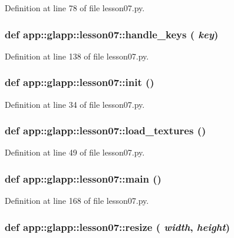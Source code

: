 Definition at line 78 of file lesson07.py.
\subsubsection{\setlength{\rightskip}{0pt plus 5cm}def app::glapp::lesson07::handle\_\-keys ( {\em key})}\label{namespaceapp_1_1glapp_1_1lesson07_1be348b6675ca03d80a6f1445422357c}




Definition at line 138 of file lesson07.py.
\subsubsection{\setlength{\rightskip}{0pt plus 5cm}def app::glapp::lesson07::init ()}\label{namespaceapp_1_1glapp_1_1lesson07_ccef139a68b9f82e4ade7b66ee1bfe27}




Definition at line 34 of file lesson07.py.
\subsubsection{\setlength{\rightskip}{0pt plus 5cm}def app::glapp::lesson07::load\_\-textures ()}\label{namespaceapp_1_1glapp_1_1lesson07_9e70d32929bccdedf5daa574f74a4504}




Definition at line 49 of file lesson07.py.
\subsubsection{\setlength{\rightskip}{0pt plus 5cm}def app::glapp::lesson07::main ()}\label{namespaceapp_1_1glapp_1_1lesson07_c64f38bc35c2259eb7a47faadf5cb357}




Definition at line 168 of file lesson07.py.
\subsubsection{\setlength{\rightskip}{0pt plus 5cm}def app::glapp::lesson07::resize ( {\em width},  {\em height})}\label{namespaceapp_1_1glapp_1_1lesson07_f54d755c1a0e6df3b058dfce286b99cf}




